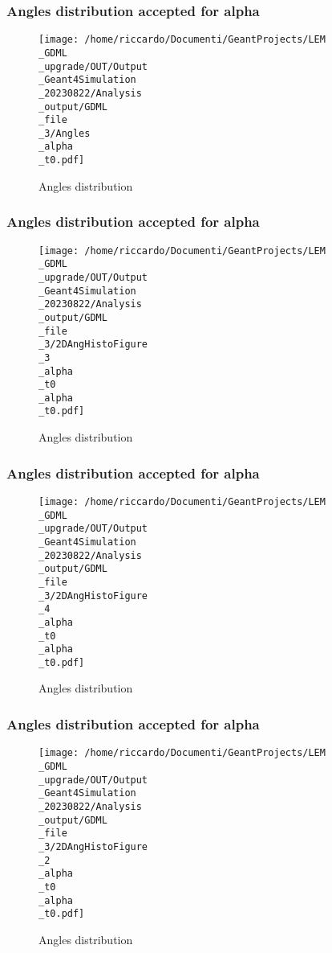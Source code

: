 \documentclass[8pt]{beamer}
\begin{document}
            \begin{frame}
                \frametitle{Angles distribution accepted for alpha}
            
        \begin{figure}[h]
            \centering
            \texttt{[image: /home/riccardo/Documenti/GeantProjects/LEM\\\_GDML\\\_upgrade/OUT/Output\\\_Geant4Simulation\\\_20230822/Analysis\\\_output/GDML\\\_file\\\_3/Angles\\\_alpha\\\_t0.pdf]}
            \caption{Angles distribution}
        \end{figure}
        
            \end{frame}
            
            \begin{frame}
                \frametitle{Angles distribution accepted for alpha}
            
        \begin{figure}[h]
            \centering
            \texttt{[image: /home/riccardo/Documenti/GeantProjects/LEM\\\_GDML\\\_upgrade/OUT/Output\\\_Geant4Simulation\\\_20230822/Analysis\\\_output/GDML\\\_file\\\_3/2DAngHistoFigure\\\_3\\\_alpha\\\_t0\\\_alpha\\\_t0.pdf]}
            \caption{Angles distribution}
        \end{figure}
        
            \end{frame}
            
            \begin{frame}
                \frametitle{Angles distribution accepted for alpha}
            
        \begin{figure}[h]
            \centering
            \texttt{[image: /home/riccardo/Documenti/GeantProjects/LEM\\\_GDML\\\_upgrade/OUT/Output\\\_Geant4Simulation\\\_20230822/Analysis\\\_output/GDML\\\_file\\\_3/2DAngHistoFigure\\\_4\\\_alpha\\\_t0\\\_alpha\\\_t0.pdf]}
            \caption{Angles distribution}
        \end{figure}
        
            \end{frame}
            
            \begin{frame}
                \frametitle{Angles distribution accepted for alpha}
            
        \begin{figure}[h]
            \centering
            \texttt{[image: /home/riccardo/Documenti/GeantProjects/LEM\\\_GDML\\\_upgrade/OUT/Output\\\_Geant4Simulation\\\_20230822/Analysis\\\_output/GDML\\\_file\\\_3/2DAngHistoFigure\\\_2\\\_alpha\\\_t0\\\_alpha\\\_t0.pdf]}
            \caption{Angles distribution}
        \end{figure}
        
            \end{frame}
            
\end{document}

